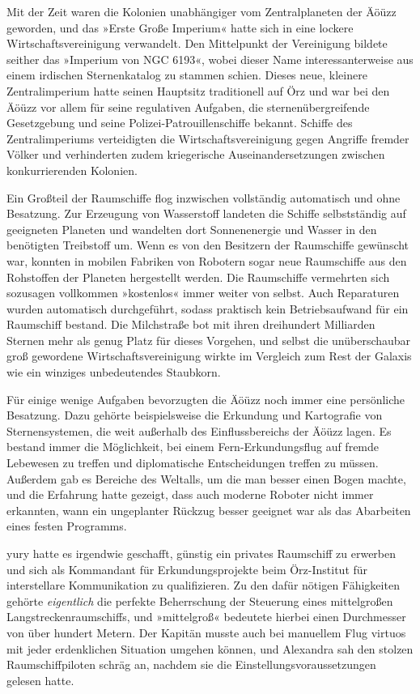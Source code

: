 Mit der Zeit waren die Kolonien unabhängiger vom Zentralplaneten der Äöüzz geworden, und das »Erste Große Imperium« hatte sich in eine lockere Wirtschaftsvereinigung verwandelt. Den Mittelpunkt der Vereinigung bildete seither das »Imperium von NGC 6193«, wobei dieser Name interessanterweise aus einem irdischen Sternenkatalog zu stammen schien. Dieses neue, kleinere Zentralimperium hatte seinen Hauptsitz traditionell auf Örz und war bei den Äöüzz vor allem für seine regulativen Aufgaben, die sternenübergreifende Gesetzgebung und seine Polizei-Patrouillenschiffe bekannt. Schiffe des Zentralimperiums verteidigten die Wirtschaftsvereinigung gegen Angriffe fremder Völker und verhinderten zudem kriegerische Auseinandersetzungen zwischen konkurrierenden Kolonien.

Ein Großteil der Raumschiffe flog inzwischen vollständig automatisch und ohne Besatzung. Zur Erzeugung von Wasserstoff landeten die Schiffe selbstständig auf geeigneten Planeten und wandelten dort Sonnenenergie und Wasser in den benötigten Treibstoff um. Wenn es von den Besitzern der Raumschiffe gewünscht war, konnten in mobilen Fabriken von Robotern sogar neue Raumschiffe aus den Rohstoffen der Planeten hergestellt werden. Die Raumschiffe vermehrten sich sozusagen vollkommen »kostenlos« immer weiter von selbst. Auch Reparaturen wurden automatisch durchgeführt, sodass praktisch kein Betriebsaufwand für ein Raumschiff bestand. Die Milchstraße bot mit ihren dreihundert Milliarden Sternen mehr als genug Platz für dieses Vorgehen, und selbst die unüberschaubar groß gewordene Wirtschaftsvereinigung wirkte im Vergleich zum Rest der Galaxis wie ein winziges unbedeutendes Staubkorn.

Für einige wenige Aufgaben bevorzugten die Äöüzz noch immer eine persönliche Besatzung. Dazu gehörte beispielsweise die Erkundung und Kartografie von Sternensystemen, die weit außerhalb des Einflussbereichs der Äöüzz lagen. Es bestand immer die Möglichkeit, bei einem Fern-Erkundungsflug auf fremde Lebewesen zu treffen und diplomatische Entscheidungen treffen zu müssen. Außerdem gab es Bereiche des Weltalls, um die man besser einen Bogen machte, und die Erfahrung hatte gezeigt, dass auch moderne Roboter nicht immer erkannten, wann ein ungeplanter Rückzug besser geeignet war als das Abarbeiten eines festen Programms.

yury hatte es irgendwie geschafft, günstig ein privates Raumschiff zu erwerben und sich als Kommandant für Erkundungsprojekte beim Örz-Institut für interstellare Kommunikation zu qualifizieren. Zu den dafür nötigen Fähigkeiten gehörte \emph{eigentlich} die perfekte Beherrschung der Steuerung eines mittelgroßen Langstreckenraumschiffs, und »mittelgroß« bedeutete hierbei einen Durchmesser von über hundert Metern. Der Kapitän musste auch bei manuellem Flug virtuos mit jeder erdenklichen Situation umgehen können, und Alexandra sah den stolzen Raumschiffpiloten schräg an, nachdem sie die Einstellungsvoraussetzungen gelesen hatte.

